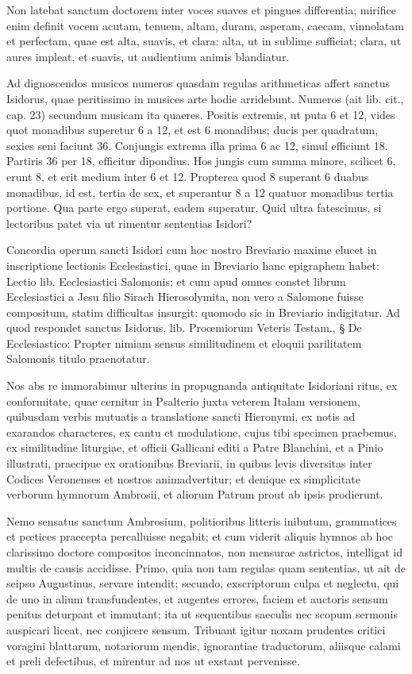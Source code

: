 \documentclass[letter,11pt]{book}
\begin{document}
Non latebat sanctum doctorem inter voces suaves et pingues differentia; mirifice enim definit vocem acutam, tenuem, altam, duram, asperam, caecam, vinnolatam et perfectam, quae est alta, suavis, et clara: alta, ut in sublime sufficiat; clara, ut aures impleat, et suavis, ut audientium animis blandiatur.

 Ad dignoscendos musicos numeros quasdam regulas arithmeticas affert sanctus Isidorus, quae peritissimo in musices arte hodie arridebunt. Numeros (ait lib. cit., cap. 23) secundum musicam ita quaeres. Positis extremis, ut puta 6 et 12, vides quot monadibus superetur 6 a 12, et est 6 monadibus; ducis per quadratum, sexies seni faciunt 36. Conjungis extrema illa prima 6 ac 12, simul efficiunt 18. Partiris 36 per 18, efficitur dipondius. Hos jungis cum summa minore, scilicet 6, erunt 8, et erit medium inter 6 et 12. Propterea quod 8 superant 6 duabus monadibus, id est, tertia de sex, et superantur 8 a 12 quatuor monadibus tertia portione. Qua parte ergo superat, eadem superatur. Quid ultra fatescimus, si lectoribus patet via ut rimentur sententias Isidori?

Concordia operum sancti Isidori cum hoc nostro Breviario maxime elucet in inscriptione lectionis Ecclesiastici, quae in Breviario hanc epigraphem habet: Lectio lib. Ecclesiastici Salomonis; et cum apud omnes constet librum Ecclesiastici a Jesu filio Sirach Hierosolymita, non vero a Salomone fuisse compositum, statim difficultas insurgit: quomodo sic in Breviario indigitatur. Ad quod respondet sanctus Isidorus, lib. Proœmiorum Veteris Testam., § De Ecclesiastico: Propter nimiam sensus similitudinem et eloquii parilitatem Salomonis titulo praenotatur.

Nos abs re immorabimur ulterius in propugnanda antiquitate Isidoriani ritus, ex conformitate, quae cernitur in Psalterio juxta veterem Italam versionem, quibusdam verbis mutuatis a translatione sancti Hieronymi, ex notis ad exarandos characteres, ex cantu et modulatione, cujus tibi specimen praebemus, ex similitudine liturgiae, et officii Gallicani editi a Patre Blanchini, et a Pinio illustrati, praecipue ex orationibus Breviarii, in quibus levis diversitas inter Codices Veronenses et nostros animadvertitur; et denique ex simplicitate verborum hymnorum Ambrosii, et aliorum Patrum prout ab ipsis prodierunt.

Nemo sensatus sanctum Ambrosium, politioribus litteris inibutum, grammatices et pœtices praecepta percalluisse negabit; et cum viderit aliquis hymnos ab hoc clarissimo doctore compositos inconcinnatos, non mensurae astrictos, intelligat id multis de causis accidisse. Primo, quia non tam regulas quam sententias, ut ait de seipso Augustinus, servare intendit; secundo, exscriptorum culpa et neglectu, qui de uno in alium transfundentes, et augentes errores, faciem et auctoris sensum penitus deturpant et immutant; ita ut sequentibus saeculis nec scopum sermonis auspicari liceat, nec conjicere sensum. Tribuant igitur noxam prudentes critici voragini blattarum, notariorum mendis, ignorantiae traductorum, aliisque calami et preli defectibus, et mirentur ad nos ut exstant pervenisse.
\end{document}
